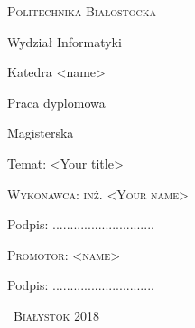 \begin{titlepage}

	\begin{center}
	{\scshape
	{\Large Politechnika Białostocka}\par
	\vspace{0.5cm}
	{\large Wydział Informatyki}\par
	\vspace{0.5cm}
	{\large Katedra <name>}\par
	\vfill
	{\Large Praca dyplomowa}\par
	\vspace{0.1cm}
	{\Large Magisterska}\par
	\vspace{2cm}
	{\LARGE
	Temat: <Your title>
	\par
	}
	\vspace{2cm}
	}
		\begin{flushright}
		{\scshape
		{\large Wykonawca: inż. <Your name>}\par
		\vspace{0.4cm}
		{\large Podpis: .............................}\par
		}
		\end{flushright}
		\vspace{2cm}
		\begin{flushleft}
		{\scshape
		{\large Promotor: <name>}\par
		\vspace{0.4cm}
		{\large \hspace{0.73cm} Podpis: .............................}\par
		}
		\end{flushleft}
		\vfill
		{\scshape\large\ Białystok 2018}
	\end{center}


\end{titlepage}
